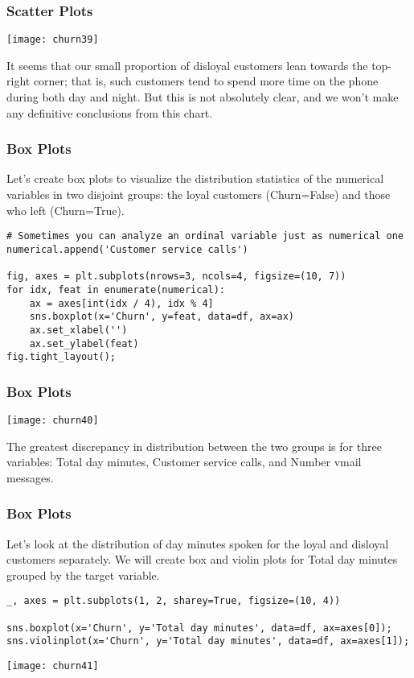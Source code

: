 \begin{frame}[fragile]\frametitle{Scatter Plots}
\begin{center}
\texttt{[image: churn39]}
\end{center}
It seems that our small proportion of disloyal customers lean towards the top-right corner; that is, such customers tend to spend more time on the phone during both day and night. But this is not absolutely clear, and we won't make any definitive conclusions from this chart.
\end{frame}

\begin{frame}[fragile]\frametitle{Box Plots}
 Let's create box plots to visualize the distribution statistics of the numerical variables in two disjoint groups: the loyal customers (Churn=False) and those who left (Churn=True).
 \begin{lstlisting}
# Sometimes you can analyze an ordinal variable just as numerical one
numerical.append('Customer service calls')

fig, axes = plt.subplots(nrows=3, ncols=4, figsize=(10, 7))
for idx, feat in enumerate(numerical):
    ax = axes[int(idx / 4), idx % 4]
    sns.boxplot(x='Churn', y=feat, data=df, ax=ax)
    ax.set_xlabel('')
    ax.set_ylabel(feat)
fig.tight_layout();
\end{lstlisting}
\end{frame}

\begin{frame}[fragile]\frametitle{Box Plots}
\begin{center}
\texttt{[image: churn40]}
\end{center}
The greatest discrepancy in distribution between the two groups is for three variables: Total day minutes, Customer service calls, and Number vmail messages. 
\end{frame}

\begin{frame}[fragile]\frametitle{Box Plots}
Let's look at the distribution of day minutes spoken for the loyal and disloyal customers separately. We will create box and violin plots for Total day minutes grouped by the target variable.
 \begin{lstlisting}
_, axes = plt.subplots(1, 2, sharey=True, figsize=(10, 4))

sns.boxplot(x='Churn', y='Total day minutes', data=df, ax=axes[0]);
sns.violinplot(x='Churn', y='Total day minutes', data=df, ax=axes[1]);
\end{lstlisting}
\begin{center}
\texttt{[image: churn41]}
\end{center}
\end{frame}


